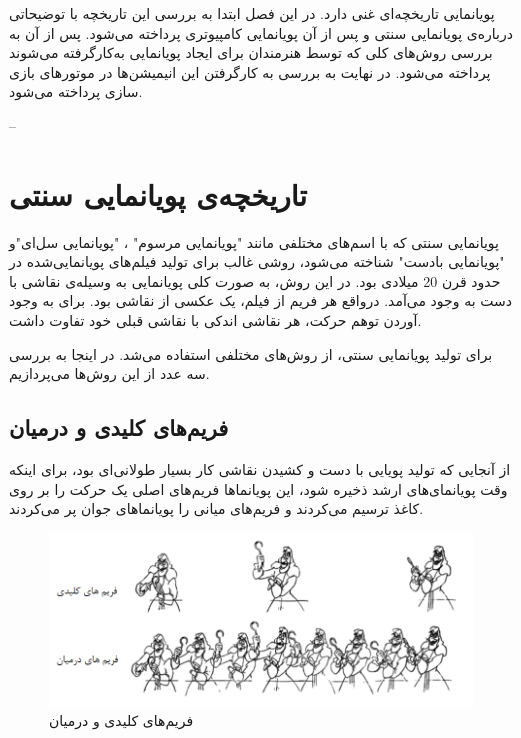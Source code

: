 پویانمایی تاریخچه‌ای غنی‌ دارد. در این فصل ابتدا به بررسی این تاریخچه با توضیحاتی 
درباره‌ی پویانمایی سنتی و پس از آن پویانمایی کامپیوتری پرداخته می‌شود.
پس از آن به بررسی روش‌های کلی که توسط هنرمندان برای ایجاد پویانمایی به‌کارگرفته می‌شوند پرداخته می‌شود.
در نهایت به بررسی به کارگرفتن این انیمیشن‌ها در موتورهای بازی سازی پرداخته می‌شود.




--




\section{تاریخچه‌ی پویانمایی سنتی}

پویانمایی سنتی که با اسم‌های مختلفی مانند "پویانمایی مرسوم" ، "پویانمایی سل‌ای"و "پویانمایی بادست" شناخته می‌شود، روشی 
غالب برای تولید فیلم‌های پویانمایی‌شده در حدود قرن 20 میلادی بود.
در این روش، به صورت کلی پویانمایی به وسیله‌ی نقاشی با دست به وجود می‌‌آمد.
درواقع هر فریم از فیلم، یک عکسی از نقاشی بود.
برای به وجود آوردن توهم حرکت، هر نقاشی اندکی با نقاشی قبلی خود تفاوت داشت.

برای تولید پویانمایی سنتی، از روش‌های مختلفی استفاده می‌شد. در اینجا به بررسی
سه عدد از این روش‌ها می‌پردازیم.

\subsection{فریم‌های کلیدی و درمیان}
از آنجایی که تولید پویایی با دست و کشیدن نقاشی کار بسیار طولانی‌ای بود، برای اینکه وقت پویانمای‌های ارشد 
ذخیره شود، این پویانماها فریم‌های اصلی یک حرکت را بر روی کاغذ ترسیم می‌کردند و 
فریم‌های میانی را پویانماهای جوان پر می‌کردند.

\begin{figure}[ht]
	\centerline{\includegraphics[width=\textwidth,height=\textheight,keepaspectratio]{Figures/Ch1/KeyframeAnimation.png}}

	\caption{فریم‌های کلیدی و درمیان}
	\label{fig:KeyframeAnimation}
\end{figure}

